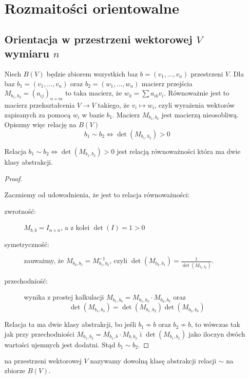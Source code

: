 \section{Rozmaitości orientowalne}

\subsection{Orientacja w przestrzeni wektorowej $V$ wymiaru $n$}

Niech $B(V)$ będzie zbiorem wszystkich baz $b=(v_1,...,v_n)$ przestrzeni $V$. Dla baz $b_1=(v_1,...,v_n)$ oraz $b_2=(w_1,...,w_n)$ macierz przejścia $M_{b_1,b_2}=(a_{ij})_{n\times m}$ to taka macierz, że $w_k=\sum a_{ik}v_i$. Równoważnie jest to macierz przekształcenia $V\to V$ takiego, że $v_i\mapsto w_i$, czyli wyrażenia wektorów zapisanych za pomocą $w_i$ w bazie $b_1$. Macierz $M_{b_1,b_2}$ jest macierzą nieosobliwą. Opiszmy więc relację na $B(V)$
$$b_1\sim b_2\iff \det(M_{b_1,b_2})>0$$

\begin{lemma}
  Relacja $b_1\sim b_2\iff \det(M_{b_1,b_2})>0$ jest relacją równoważności która ma dwie klasy abstrakcji.
\end{lemma}

\begin{proof}$ $

  Zaczniemy od udowodnienia, że jest to relacja równoważności:
  \begin{description}
    \item[zwrotność:] $M_{b,b}=I_{n\times n}$, a z kolei $\det(I)=1>0$
    \item[symetryczność:] zauważmy, że $M_{b_2,b_1}=M_{b_1,b_2}^{-1}$, czyli $\det(M_{b_2,b_1})=\frac{1}{\det(M_{b_1,b_2})}$.
    \item[przechodniość:] wynika z prostej kalkulacji $M_{b_1,b_3}=M_{b_1,b_2}\cdot M_{b_2,b_3}$ oraz
      $$\det(M_{b_1,b_3})=\det(M_{b_1,b_2})\det(M_{b_2,b_3})$$
  \end{description}

  Relacja ta ma dwie klasy abstrakcji, bo jeśli $b_1\not\sim b$ oraz $b_2\not\sim b$, to wówczas tak jak przy przechodniości $M_{b_1,b_2}=M_{b_1,b}\cdot M_{b,b_2}$ i $\det(M_{b_1,b_2})$ jako iloczyn dwóch wartości ujemnych jest dodatni. Stąd $b_1\sim b_2$.
\end{proof}

\begin{definition}
   na przestrzeni wektorowej $V$ nazywamy dowolną klasę abstrakcji relacji $\sim$ na zbiorze $B(V)$.
\end{definition}
